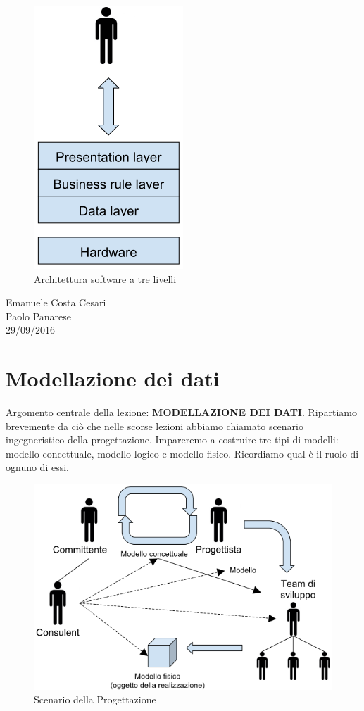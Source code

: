 \begin{center}
\begin{figure}[H]
\centering
\includegraphics[scale=1]{figures/tla.png}
\caption{Architettura software a tre livelli} 
\end{figure}
\end{center}

\begin{flushright}Emanuele Costa Cesari\\Paolo Panarese\\29/09/2016\end{flushright}

\section{Modellazione dei dati}

Argomento centrale della lezione: \textbf{MODELLAZIONE DEI DATI}. Ripartiamo brevemente da ciò che nelle scorse lezioni abbiamo chiamato scenario ingegneristico della progettazione. Impareremo a costruire tre tipi di modelli: modello concettuale, modello logico e modello fisico. Ricordiamo qual è il ruolo di ognuno di essi.  

\begin{center}
\begin{figure}[H]
\centering
\includegraphics[scale=1]{figures/mdlng2.png}
\caption{Scenario della Progettazione} 
\end{figure}
\end{center}

